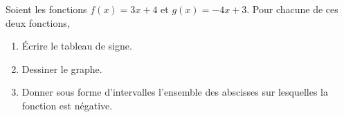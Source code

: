 
\begin{exercice}\label{exosmath-0148}

    Soient les fonctions \( f(x)=3x+4\) et \( g(x)=-4x+3\). Pour chacune de ces deux fonctions,
    \begin{enumerate}
        \item
            Écrire le tableau de signe.
        \item
            Dessiner le graphe.
        \item
            Donner sous forme d'intervalles l'ensemble des abscisses sur lesquelles la fonction est négative.
    \end{enumerate}

\end{exercice}
